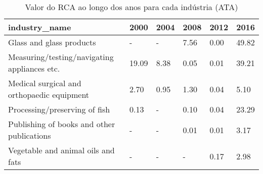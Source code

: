 \begin{table}
\centering
\caption{Valor do RCA ao longo dos anos para cada indústria (ATA)}
\begin{tabular}{p{6cm}p{1.5cm}p{1.5cm}p{1.5cm}p{1.5cm}p{1.5cm}}
\toprule
                               industry\_name &  2000 & 2004 & 2008 & 2012 &  2016 \\
\midrule
                    Glass and glass products &     - &    - & 7.56 & 0.00 & 49.82 \\
Measuring/testing/navigating appliances etc. & 19.09 & 8.38 & 0.05 & 0.01 & 39.21 \\
  Medical surgical and orthopaedic equipment &  2.70 & 0.95 & 1.30 & 0.04 &  5.10 \\
               Processing/preserving of fish &  0.13 &    - & 0.10 & 0.04 & 23.29 \\
  Publishing of books and other publications &     - &    - & 0.01 & 0.01 &  3.17 \\
          Vegetable and animal oils and fats &     - &    - &    - & 0.17 &  2.98 \\
\bottomrule
\end{tabular}
\end{table}
